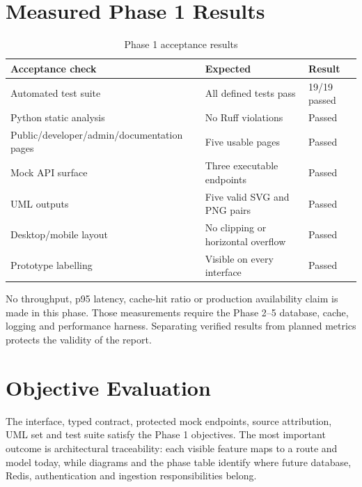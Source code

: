 \documentclass{tietreport}
\begin{document}
\section{Measured Phase 1 Results}
\begin{table}[H]
\centering
\begin{tabularx}{\textwidth}{@{}X p{3.2cm}p{2.7cm}@{}}
\toprule
\textbf{Acceptance check} & \textbf{Expected} & \textbf{Result} \\
\midrule
Automated test suite & All defined tests pass & 19/19 passed \\
Python static analysis & No Ruff violations & Passed \\
Public/developer/admin/documentation pages & Five usable pages & Passed \\
Mock API surface & Three executable endpoints & Passed \\
UML outputs & Five valid SVG and PNG pairs & Passed \\
Desktop/mobile layout & No clipping or horizontal overflow & Passed \\
Prototype labelling & Visible on every interface & Passed \\
\bottomrule
\end{tabularx}
\caption{Phase 1 acceptance results}
\label{tab:results}
\end{table}

No throughput, p95 latency, cache-hit ratio or production availability claim is made in this
phase. Those measurements require the Phase 2--5 database, cache, logging and performance
harness. Separating verified results from planned metrics protects the validity of the report.

\section{Objective Evaluation}
The interface, typed contract, protected mock endpoints, source attribution, UML set and test
suite satisfy the Phase 1 objectives. The most important outcome is architectural traceability:
each visible feature maps to a route and model today, while diagrams and the phase table identify
where future database, Redis, authentication and ingestion responsibilities belong.
\end{document}

